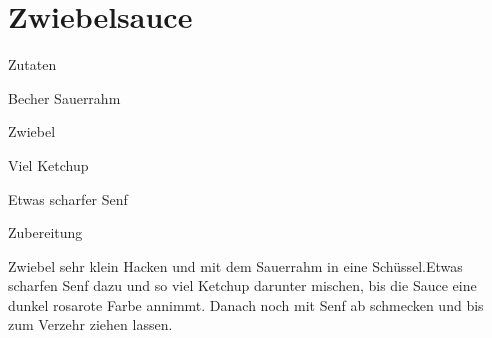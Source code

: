 \chapter*{Zwiebelsauce}
\begin{multicols}{2}
 {\Large Zutaten}
 \begin{Zutaten}
		\item {} Becher Sauerrahm
		\item {} Zwiebel
		\item Viel Ketchup
		\item Etwas scharfer Senf
		
		
		
\end{Zutaten}
	
\columnbreak
{}
\end{multicols}

{\Large Zubereitung} \newline
\begin{addmargin}[1cm]{0cm}
	 Zwiebel sehr klein Hacken und mit dem Sauerrahm in eine Schüssel.\newline Etwas scharfen Senf dazu und
	so viel Ketchup darunter mischen, bis die Sauce eine dunkel rosarote Farbe annimmt.\newline
	Danach noch mit Senf ab schmecken und bis zum Verzehr ziehen lassen.
	
\end{addmargin}
